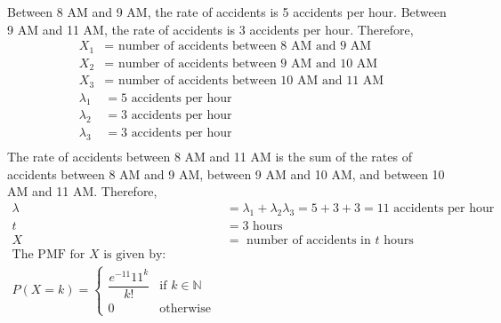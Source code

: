 \documentclass[answers]{exam}
\begin{document}
\begin{questions}
    \begin{solution}
        Between 8 AM and 9 AM, the rate of accidents is 5 accidents per hour. Between 9 AM and 11 AM, the rate of
        accidents is 3 accidents per hour. Therefore,
        \begin{align*}
            X_1       & = \text{ number of accidents between 8 AM and 9 AM}   \\
            X_2       & = \text{ number of accidents between 9 AM and 10 AM}  \\
            X_3       & = \text{ number of accidents between 10 AM and 11 AM} \\
            \lambda_1 & = 5 \text{ accidents per hour}                        \\
            \lambda_2 & = 3 \text{ accidents per hour}                        \\
            \lambda_3 & = 3 \text{ accidents per hour}                        \\
        \end{align*}
        The rate of accidents between 8 AM and 11 AM is the sum of the rates of accidents between 8 AM and 9 AM, between 9 AM and 10 AM, and
        between 10 AM and 11 AM. Therefore,
        \begin{align*}
            \lambda & = \lambda_1 + \lambda_2 \lambda_3 = 5 + 3 + 3 = 11 \text{ accidents per hour} \\
            t       & = 3 \text{ hours}                                              \\
            X       & = \text{ number of accidents in } t \text{ hours}              \\
            \text{The PMF for } X \text{ is given by:}                               \\
            P(X = k) = \begin{cases}
                           \dfrac{e^{-11} 11^k}{k!} & \text{if } k \in \mathbb{N} \\
                           0                      & \text{otherwise}
                       \end{cases}
        \end{align*}
    \end{solution}

\end{questions}
\end{document}
